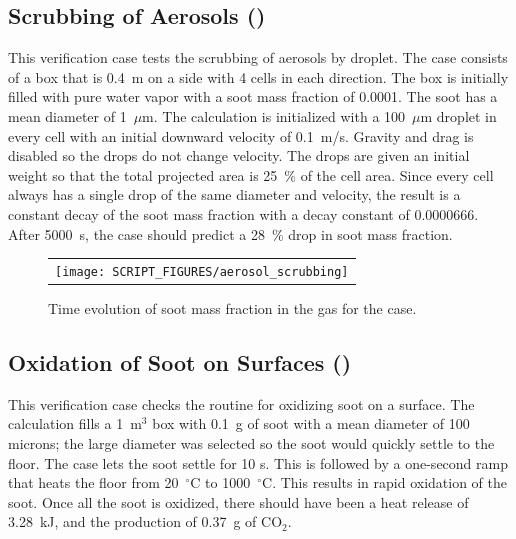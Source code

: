 \documentclass[11pt]{book}
\begin{document}
\subsection{Scrubbing of Aerosols (\texorpdfstring{}{aerosol\_scrubbing})}
\label{aerosol_scrubbing}

This verification case tests the scrubbing of aerosols by droplet. The case consists of a box that is 0.4~m on a side with 4 cells in each direction. The box is initially filled with pure water vapor with a soot mass fraction of 0.0001. The soot has a mean diameter of 1~$\mu$m. The calculation is initialized with a 100~$\mu$m droplet in every cell with an initial downward velocity of 0.1~m/s. Gravity and drag is disabled so the drops do not change velocity. The drops are given an initial weight so that the total projected area is 25~\% of the cell area. Since every cell always has a single drop of the same diameter and velocity, the result is a constant decay of the soot mass fraction with a decay constant of 0.0000666. After 5000~s, the case should predict a 28~\% drop in soot mass fraction.

\begin{figure}[ht]
    \centering
    \begin{tabular}{c}
        \texttt{[image: SCRIPT\_FIGURES/aerosol\_scrubbing]}
    \end{tabular}
    \caption[Gas phase soot mass fractions the  cases]{Time evolution of soot mass fraction in the gas for the  case.}
    \label{fig:scrubbing}
\end{figure}


\subsection{Oxidation of Soot on Surfaces (\texorpdfstring{}{soot\_oxidation\_wall})}
\label{soot_oxidation_wall}

This verification case checks the routine for oxidizing soot on a surface. The calculation fills a 1~m$^3$ box with 0.1~g of soot with a mean diameter of 100 microns; the large diameter was selected so the soot would quickly settle to the floor. The case lets the soot settle for 10 s. This is followed by a one-second ramp that heats the floor from 20~$^\circ$C to 1000~$^\circ$C. This results in rapid oxidation of the soot. Once all the soot is oxidized, there should have been a heat release of  3.28~kJ, and the production of 0.37~g of CO$_2$.
\end{document}

